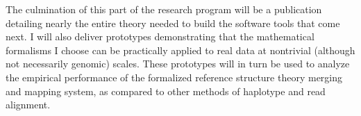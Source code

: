 \documentclass[11pt,proposal]{ucthesis}
\begin{document}
The culmination of this part of the research program will be a publication detailing nearly the entire theory needed to build the software tools that come next. I will also deliver prototypes demonstrating that the mathematical formalisms I choose can be practically applied to real data at nontrivial (although not necessarily genomic) scales. These prototypes will in turn be used to analyze the empirical performance of the formalized reference structure theory merging and mapping system, as compared to other methods of haplotype and read alignment.


    
    
    
        
        
        
        
        
    
    
        
        
        
        
    
    
\end{document}
